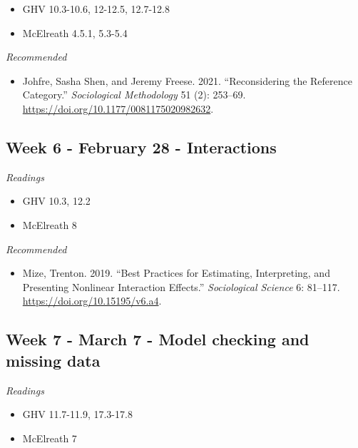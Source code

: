 \documentclass[
  10pt,
]{article}
\providecommand{\tightlist}{%
  \setlength{\itemsep}{0pt}\setlength{\parskip}{0pt}}
\begin{document}
\begin{itemize}
\tightlist
\item
  GHV 10.3-10.6, 12-12.5, 12.7-12.8
\item
  McElreath 4.5.1, 5.3-5.4
\end{itemize}

\emph{Recommended}

\begin{itemize}
\tightlist
\item
  Johfre, Sasha Shen, and Jeremy Freese. 2021. ``Reconsidering the
  Reference Category.'' \emph{Sociological Methodology} 51 (2): 253--69.
  \url{https://doi.org/10.1177/0081175020982632}.
\end{itemize}

\hypertarget{week-6---february-28---interactions}{%
\subsection{Week 6 - February 28 -
Interactions}\label{week-6---february-28---interactions}}

\emph{Readings}

\begin{itemize}
\tightlist
\item
  GHV 10.3, 12.2
\item
  McElreath 8
\end{itemize}

\emph{Recommended}

\begin{itemize}
\tightlist
\item
  Mize, Trenton. 2019. ``Best Practices for Estimating, Interpreting,
  and Presenting Nonlinear Interaction Effects.'' \emph{Sociological
  Science} 6: 81--117. \url{https://doi.org/10.15195/v6.a4}.
\end{itemize}

\hypertarget{week-7---march-7---model-checking-and-missing-data}{%
\subsection{Week 7 - March 7 - Model checking and missing
data}\label{week-7---march-7---model-checking-and-missing-data}}

\emph{Readings}

\begin{itemize}
\tightlist
\item
  GHV 11.7-11.9, 17.3-17.8
\item
  McElreath 7
\end{itemize}
\end{document}
